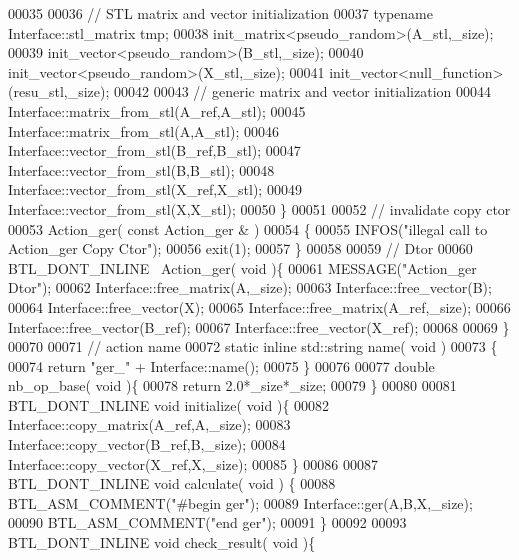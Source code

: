 \begin{DoxyCode}
00035 
00036     \textcolor{comment}{// STL matrix and vector initialization}
00037     \textcolor{keyword}{typename} Interface::stl\_matrix tmp;
00038     init\_matrix<pseudo\_random>(A\_stl,\_size);
00039     init\_vector<pseudo\_random>(B\_stl,\_size);
00040     init\_vector<pseudo\_random>(X\_stl,\_size);
00041     init\_vector<null\_function>(resu\_stl,\_size);
00042 
00043     \textcolor{comment}{// generic matrix and vector initialization}
00044     Interface::matrix\_from\_stl(A\_ref,A\_stl);
00045     Interface::matrix\_from\_stl(A,A\_stl);
00046     Interface::vector\_from\_stl(B\_ref,B\_stl);
00047     Interface::vector\_from\_stl(B,B\_stl);
00048     Interface::vector\_from\_stl(X\_ref,X\_stl);
00049     Interface::vector\_from\_stl(X,X\_stl);
00050   \}
00051 
00052   \textcolor{comment}{// invalidate copy ctor}
00053   Action\_ger( \textcolor{keyword}{const}  Action\_ger & )
00054   \{
00055     INFOS(\textcolor{stringliteral}{"illegal call to Action\_ger Copy Ctor"});
00056     exit(1);
00057   \}
00058 
00059   \textcolor{comment}{// Dtor}
00060   BTL\_DONT\_INLINE ~Action\_ger( \textcolor{keywordtype}{void} )\{
00061     MESSAGE(\textcolor{stringliteral}{"Action\_ger Dtor"});
00062     Interface::free\_matrix(A,\_size);
00063     Interface::free\_vector(B);
00064     Interface::free\_vector(X);
00065     Interface::free\_matrix(A\_ref,\_size);
00066     Interface::free\_vector(B\_ref);
00067     Interface::free\_vector(X\_ref);
00068 
00069   \}
00070 
00071   \textcolor{comment}{// action name}
00072   \textcolor{keyword}{static} \textcolor{keyword}{inline} std::string name( \textcolor{keywordtype}{void} )
00073   \{
00074     \textcolor{keywordflow}{return} \textcolor{stringliteral}{"ger\_"} + Interface::name();
00075   \}
00076 
00077   \textcolor{keywordtype}{double} nb\_op\_base( \textcolor{keywordtype}{void} )\{
00078     \textcolor{keywordflow}{return} 2.0*\_size*\_size;
00079   \}
00080 
00081   BTL\_DONT\_INLINE  \textcolor{keywordtype}{void} initialize( \textcolor{keywordtype}{void} )\{
00082     Interface::copy\_matrix(A\_ref,A,\_size);
00083     Interface::copy\_vector(B\_ref,B,\_size);
00084     Interface::copy\_vector(X\_ref,X,\_size);
00085   \}
00086 
00087   BTL\_DONT\_INLINE \textcolor{keywordtype}{void} calculate( \textcolor{keywordtype}{void} ) \{
00088     BTL\_ASM\_COMMENT(\textcolor{stringliteral}{"#begin ger"});
00089     Interface::ger(A,B,X,\_size);
00090     BTL\_ASM\_COMMENT(\textcolor{stringliteral}{"end ger"});
00091   \}
00092 
00093   BTL\_DONT\_INLINE \textcolor{keywordtype}{void} check\_result( \textcolor{keywordtype}{void} )\{

\end{DoxyCode}
